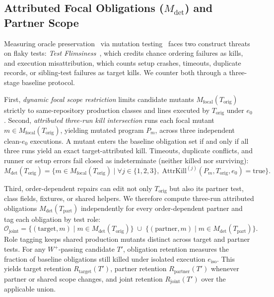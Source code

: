 \subsection{Attributed Focal Obligations (\texorpdfstring{$M_{\text{det}}$}{M\_det}) and Partner Scope}

Measuring oracle preservation~\cite{barr2015oracle} via mutation testing~\cite{just2014mutants,papadakis2019mutation} faces two construct threats on flaky tests: \emph{Test Flimsiness}~\cite{parry2026flimsiness}, which credits chance ordering failures as kills, and execution misattribution, which counts setup crashes, timeouts, duplicate records, or sibling-test failures as target kills. We counter both through a three-stage baseline protocol.

First, \emph{dynamic focal scope restriction} limits candidate mutants $M_{\text{focal}}(T_{\text{orig}})$ strictly to same-repository production classes and lines executed by $T_{\text{orig}}$ under $e_0$. Second, \emph{attributed three-run kill intersection} runs each focal mutant $m \in M_{\text{focal}}(T_{\text{orig}})$, yielding mutated program $P_m$, across three independent clean-$e_0$ executions. A mutant enters the baseline obligation set if and only if all three runs yield an exact target-attributed kill. Timeouts, duplicate conflicts, and runner or setup errors fail closed as indeterminate (neither killed nor surviving):
\begin{equation}
\label{eq:m_det}
M_{\text{det}}(T_{\text{orig}}) = \Big\{ m \in M_{\text{focal}}(T_{\text{orig}}) \;\Big|\; \forall j \in \{1, 2, 3\},\; \text{AttrKill}^{(j)}(P_m, T_{\text{orig}}, e_0) = \text{true} \Big\}.
\end{equation}

Third, order-dependent repairs can edit not only $T_{\text{orig}}$ but also its partner test, class fields, fixtures, or shared helpers. We therefore compute three-run attributed obligations $M_{\text{det}}(T_{\text{part}})$ independently for every order-dependent partner and tag each obligation by test role:
\begin{equation}
\label{eq:joint}
\mathcal{O}_{\text{joint}} = \big\{ (\text{target}, m) \mid m \in M_{\text{det}}(T_{\text{orig}}) \big\} \;\cup\; \big\{ (\text{partner}, m) \mid m \in M_{\text{det}}(T_{\text{part}}) \big\}.
\end{equation}
Role tagging keeps shared production mutants distinct across target and partner tests. For any $W^+$-passing candidate $T'$, obligation retention measures the fraction of baseline obligations still killed under isolated execution $e_{\text{iso}}$. This yields target retention $R_{\text{target}}(T')$, partner retention $R_{\text{partner}}(T')$ whenever partner or shared scope changes, and joint retention $R_{\text{joint}}(T')$ over the applicable union.


